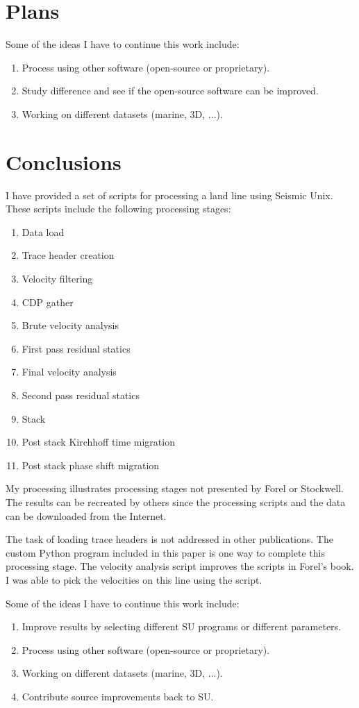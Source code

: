 \section{Plans}
Some of the ideas I have to continue this work include:

\begin{enumerate}
\item Process using other software (open-source or proprietary). 
\item Study difference and see if the open-source software can be improved.
\item Working on different datasets (marine, 3D, ...).
\end{enumerate}

\section{Conclusions}
I have provided a set of scripts for processing a land line using
Seismic Unix. These scripts include the following processing stages:
\begin{enumerate}
\item Data load
\item Trace header creation
\item Velocity filtering 
\item CDP gather
\item Brute velocity analysis
\item First pass residual statics
\item Final velocity analysis
\item Second pass residual statics
\item Stack
\item Post stack Kirchhoff time migration
\item Post stack phase shift migration
\end{enumerate}

My processing illustrates processing stages not presented by Forel
or Stockwell. The results can be recreated by others since the processing
scripts and the data can be downloaded from the Internet.

The task of loading trace headers is not addressed in other
publications.  The custom Python program included in this paper is one
way to complete this processing stage.  The velocity analysis script 
improves the scripts in Forel's book.  I was able to pick the velocities 
on this line using the script.

Some of the ideas I have to continue this work include:
\begin{enumerate}
\item Improve results by selecting different SU programs or different 
parameters. 
\item Process using other software (open-source or proprietary).
\item Working on different datasets (marine, 3D, ...).
\item Contribute source improvements back to SU.
\end{enumerate}

